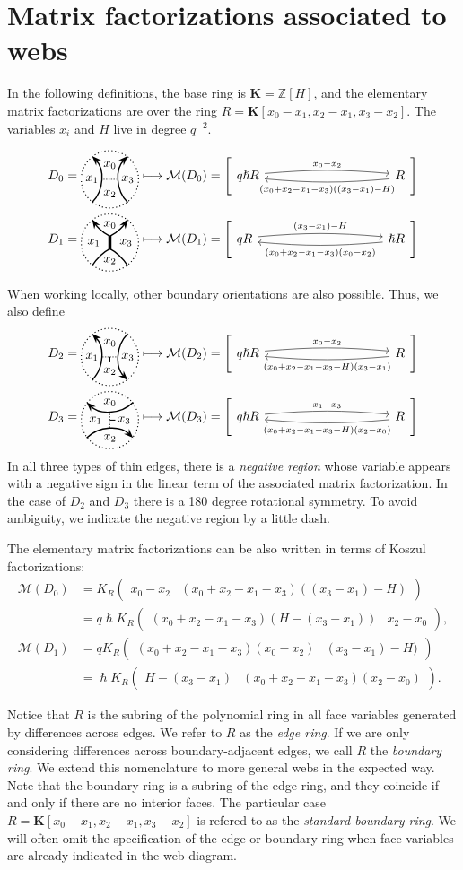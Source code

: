 \documentclass{article}
\newcommand{\Z}{\mathbb{Z}}
\newcommand{\maf}{\mathcal{M}}
\newcommand{\mf}[4]{%
  \begin{tikzcd}[column sep=3.5cm, ampersand replacement=\&]
    {#1} \arrow[r, "#3", shift left=0.5ex, bend left=5,start anchor=east, end anchor=west] \arrow[r, leftarrow, "#4", shift right=0.5ex, bend right=5, swap, start anchor=east, end anchor=west] \& 
    {#2}
  \end{tikzcd}%
}
\newcommand{\kmf}[2]{
	K_{#1}{\begin{pmatrix}
			#2
		\end{pmatrix}
	}	
}
\theoremstyle{plain} %
\theoremstyle{definition} %
\theoremstyle{remark} %
\begin{document}
\section{Matrix factorizations associated to webs}
In the following definitions, the base ring is $\mathbf K=\Z[H]$, and the elementary matrix factorizations are over the ring $R=\mathbf K[x_0-x_1,x_2-x_1,x_3-x_2]$. The variables $x_i$ and $H$ live in degree $q^{-2}$.

\begin{align*}
	D_0=\ThinEdgeStandard 
	&\longmapsto \maf(D_0)=\left[\mf{q\hslash R}{ R}{x_0-x_2}{(x_0+x_2-x_1-x_3)((x_3-x_1)-H)}\right]
	\\
	D_1=\ThickEdgeStandard 
	&\longmapsto \maf(D_1)=\left[\mf{q R}{\hslash R}{(x_3-x_1)-H}{(x_0+x_2-x_1-x_3)(x_0-x_2)}\right]
\end{align*}

When working locally, other boundary orientations are also possible. Thus, we also define
\begin{align*}
	D_2=\UnorientedHorizontalThinEdgeStandard 
	&
	\longmapsto \maf(D_2)=\left[\mf{q\hslash R}{ R}{x_0-x_2}{(x_0+x_2-x_1-x_3-H)(x_3-x_1)}\right]
	\\
	D_3=\UnorientedVerticalThinEdgeStandard 
	&
	\longmapsto \maf(D_3)=\left[\mf{q\hslash R}{ R}{x_1-x_3}{(x_0+x_2-x_1-x_3-H)(x_2-x_0)}\right]
\end{align*}
In all three types of thin edges, there is a \emph{negative region} whose variable appears with a negative sign in the linear term of the associated matrix factorization. In the case of $D_2$ and $D_3$ there is a 180 degree rotational symmetry. To avoid ambiguity, we indicate the negative region by a little dash.



The elementary matrix factorizations can be also written in terms of Koszul factorizations:
\begin{align*}
	\maf(D_0)
	&
	=\kmf{R}{x_0-x_2 &(x_0+x_2-x_1-x_3)((x_3-x_1)-H)}
	\\
	&
	=q \hslash \kmf{R}{(x_0+x_2-x_1-x_3)(H-(x_3-x_1)) & x_2-x_0}
	,	
	\\[0.2cm]
	\maf(D_1)    
	&
	= q\kmf{R}{(x_0+x_2-x_1-x_3)(x_0-x_2)& (x_3-x_1)-H)}	
	\\
	&
	=\hslash \kmf{R}{H-(x_3-x_1)&(x_0+x_2-x_1-x_3)(x_2-x_0)}
	.
\end{align*}

Notice that $R$ is the subring of the polynomial ring in all face variables generated by differences across edges. We refer to $R$ as the \emph{edge ring}. If we are only considering differences across boundary-adjacent edges, we call $R$ the \emph{boundary ring}. We extend this nomenclature to more general webs in the expected way. Note that the boundary ring is a subring of the edge ring, and they coincide if and only if there are no interior faces. The particular case $R=\mathbf K[x_0-x_1,x_2-x_1,x_3-x_2]$ is refered to as the \emph{standard boundary ring}. We will often omit the specification of the edge or boundary ring when face variables are already indicated in the web diagram.
\end{document}

